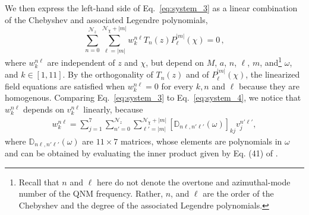 \documentclass[aps,prx,amsmath,floats,floatfix,twocolumn,
  superscriptaddress,nofootinbib,showpacs]{revtex4-1}
\begin{document}
We then express the left-hand side of Eq.~\eqref{eq:system_3} as a linear combination of the Chebyshev and associated Legendre polynomials, 
\begin{equation}\label{eq:elliptic_eqn_v2}
\sum_{n=0}^{\mathcal{N}_z} \sum_{\ell=|m|}^{\mathcal{N}_{\chi}+|m|} w_k^{n \ell} T_{n}(z) P^{|m|}_{\ell}(\chi) = 0\,, 
\end{equation}
where $w_k^{n \ell}$ are independent of $z$ and $\chi$, but depend on $M$, $a$, $n$, $\ell$, $m$, and\footnote{Recall that $n$ and $\ell$ here do not denote the overtone and azimuthal-mode number of the QNM frequency. Rather, $n$, and $\ell$ are the order of the Chebyshev and the degree of the associated Legendre polynomials.} $\omega$, and $k \in [1,11]$. 
By the orthogonality of $T_{n}(z)$ and of $P^{|m|}_{\ell}(\chi)$, the linearized field equations are satisfied when $ w_k^{n \ell} = 0 $ for every $k, n$ and $\ell$ because they are homogenous. 
Comparing Eq.~\eqref{eq:system_3} to Eq.~\eqref{eq:system_4}, we notice that $w_k^{n \ell}$ depends on $v_k^{n \ell}$ linearly, because
\begin{equation}
\label{eq:pertFE-2}
\begin{split}
w_k^{n \ell} = \sum_{j=1}^{7} \sum_{n'=0}^{\mathcal{N}_z} \sum_{\ell'=|m|}^{\mathcal{N}_{\chi}+|m|} \left[ \mathbb{D}_{n \ell, n' \ell'}(\omega) \right]_{kj} v_j^{n' \ell'}, 
\end{split}
\end{equation}
where $\mathbb{D}_{n \ell, n' \ell'}(\omega)$ are $11 \times 7$ matrices, whose elements are polynomials in $\omega$ and can be obtained by evaluating the inner product given by Eq. (41) of \cite{Chung:2023zdq}.  
\end{document}

